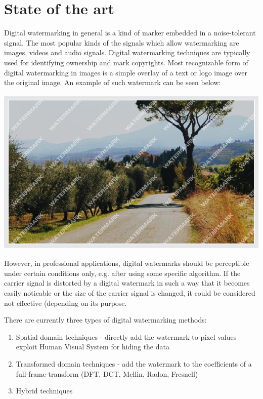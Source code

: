 \documentclass[a4paper, 12pt]{article}
\begin{document}
\section{State of the art}

Digital watermarking in general is a kind of marker embedded in a noise-tolerant signal. The most popular kinds of the signals which allow watermarking are images, videos and audio signals. Digital watermarking techniques are typically used for identifying ownership and mark copyrights. Most recognizable form of digital watermarking in images is a simple overlay of a text or logo image over the original image. An example of such watermark can be seen below:

\begin{center}
    \includegraphics[width=1\textwidth]{ex.png} \par
\end{center}

However, in professional applications, digital watermarks should be perceptible under certain conditions only, e.g. after using some specific algorithm. If the carrier signal is distorted by a digital watermark in such a way that it becomes easily noticable or the size of the carrier signal is changed, it could be considered not effective (depending on its purpose. \par

There are currently three types of digital watermarking methods:

\begin{enumerate}
	\item Spatial domain techniques - directly add the watermark to pixel values - exploit Human Visual System for hiding the data
	\item Transformed domain techniques - add the watermark to the coefficients of a full-frame transform (DFT, DCT, Mellin, Radon, Fresnell)
	\item Hybrid techniques
\end{enumerate}
\end{document}
